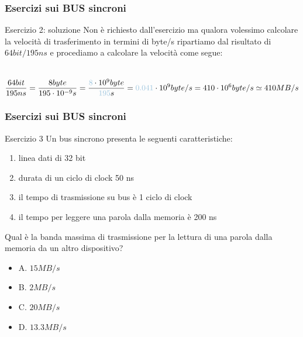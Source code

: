 \begin{frame}
	\frametitle{Esercizi sui BUS sincroni}
	
	\begin{block}{Esercizio 2: soluzione}
		Non è richiesto dall'esercizio ma qualora volessimo calcolare la velocità di trasferimento in termini di byte/s ripartiamo dal risultato di $64bit/195ns$ e procediamo a calcolare la velocità come segue:\\~\\
		
		\begin{scriptsize}
		$$\frac{64bit}{195ns} = \frac{8byte}{195 \cdot 10^{-9} s} = \frac{{\color{CpuBlue}8} \cdot 10^{9}byte}{{\color{CpuBlue}195}s}= {\color{CpuBlue}0.041} \cdot 10^{9} byte/s = 410 \cdot 10^{6} byte/s \simeq 410 MB/s$$
		\end{scriptsize}
		
	\end{block}
\end{frame}



\begin{frame}
	\frametitle{Esercizi sui BUS sincroni}
		
	\begin{block}{Esercizio 3}
		Un bus sincrono presenta le seguenti caratteristiche:
		\begin{scriptsize}
		\begin{enumerate}
			\item linea dati di 32 bit
			\item durata di un ciclo di clock 50 ns
			\item il tempo di trasmissione su bus è 1 ciclo di clock
			\item il tempo per leggere una parola dalla memoria è 200 ns
		\end{enumerate}
		\end{scriptsize}
		
		Qual è la banda massima di trasmissione per la lettura di una parola dalla memoria da un altro dispositivo?
		
		\begin{scriptsize}
		\begin{itemize}
			\item A. $15MB/s$
			\item B. $2MB/s$
			\item C. $20MB/s$
			\item D. $13.3MB/s$
		\end{itemize}
		\end{scriptsize}
	
	\end{block}
\end{frame}


